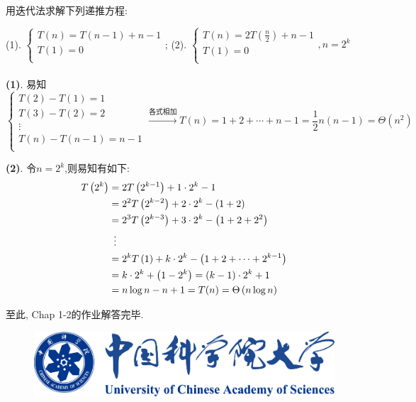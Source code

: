 \documentclass{article}
\begin{document}
\pagebreak

\begin{homeworkProblem}
	用迭代法求解下列递推方程: 

	(1). $\begin{cases}
		T\left( n \right) =T\left( n-1 \right) +n-1\\
		T\left( 1 \right) =0\\
	\end{cases}$; \quad (2). $\left\{ \begin{array}{l}
		T\left( n \right) =2T\left( \frac{n}{2} \right) +n-1\\
		T(1)=0\\
	\end{array},n=2^k \right.$
	\\

	\solution
	\\

	\textbf{(1)}. 易知$$\left\{ \begin{array}{c}
		T\left( 2 \right) -T\left( 1 \right) =1\\
		T\left( 3 \right) -T\left( 2 \right) =2\\
		\vdots\\
		T\left( n \right) -T\left( n-1 \right) =n-1\\
	\end{array} \right. \xrightarrow{\text{各式相加}}T\left( n \right) =1+2+\cdots +n-1=\frac{1}{2}n\left( n-1 \right) = \Theta \left(n^2\right)$$

	\textbf{(2)}. 令$n=2^k$,则易知有如下:
	\begin{align}
		T\left( 2^k \right) &=2T\left( 2^{k-1} \right) +1\cdot 2^k-1 \notag
		\\
		&=2^2T\left( 2^{k-2} \right) +2\cdot 2^k-\left( 1+2 \right) \notag
		\\
		&=2^3T\left( 2^{k-3} \right) +3\cdot 2^k-\left( 1+2+2^2 \right) \notag
		\\
		&\,\,\, \vdots \notag
		\\
		&=2^kT\left( 1 \right) +k\cdot 2^k-\left( 1+2+\cdots +2^{k-1} \right) \notag
		\\
		&=k\cdot 2^k+\left( 1-2^k \right) =\left( k-1 \right) \cdot 2^k+1 \notag
		\\
		&=n\log n-n+1=T(n)=\Theta\left( n\log n \right) \notag
	\end{align}
\end{homeworkProblem}

至此, Chap 1-2的作业解答完毕.

\vspace{1cm}

\begin{figure}[H]  %
	\centering
	\includegraphics[width=0.7\linewidth]{images/title/ucas_logo 1.pdf}
	\label{fig:ucas-logo}
\end{figure}




\end{document}
